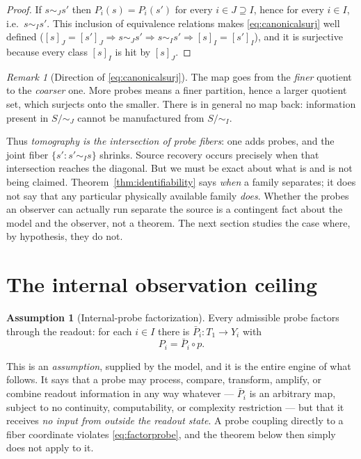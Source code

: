 \documentclass[11pt,reqno]{amsart}
\theoremstyle{plain}
\theoremstyle{definition}
\newtheorem{assumption}[theorem]{Assumption}
\theoremstyle{remark}
\newtheorem{remark}[theorem]{Remark}
\begin{document}
\begin{proof}
If $s\sim_J s'$ then $P_i(s)=P_i(s')$ for every $i\in J\supseteq I$, hence for every $i\in I$, i.e.\ $s\sim_I s'$. This inclusion of equivalence relations makes \eqref{eq:canonicalsurj} well defined ($[s]_J=[s']_J\Rightarrow s\sim_J s'\Rightarrow s\sim_I s'\Rightarrow [s]_I=[s']_I$), and it is surjective because every class $[s]_I$ is hit by $[s]_J$.
\end{proof}

\begin{remark}[Direction of \eqref{eq:canonicalsurj}]
The map goes from the \emph{finer} quotient to the \emph{coarser} one. More probes means a finer partition, hence a larger quotient set, which surjects onto the smaller. There is in general no map back: information present in $S/\!\sim_J$ cannot be manufactured from $S/\!\sim_I$.
\end{remark}

Thus \emph{tomography is the intersection of probe fibers}: one adds probes, and the joint fiber $\{s':s'\sim_I s\}$ shrinks. Source recovery occurs precisely when that intersection reaches the diagonal. But we must be exact about what is and is not being claimed. Theorem~\ref{thm:identifiability} says \emph{when} a family separates; it does not say that any particular physically available family \emph{does}. Whether the probes an observer can actually run separate the source is a contingent fact about the model and the observer, not a theorem. The next section studies the case where, by hypothesis, they do not.

\section{The internal observation ceiling}\label{sec:ceiling}

\begin{assumption}[Internal-probe factorization]\label{ass:factorization}
Every admissible probe factors through the readout: for each $i\in I$ there is $\bar P_i\colon T_1\to Y_i$ with
\begin{equation}\label{eq:factorprobe}
P_i=\bar P_i\circ p .
\end{equation}
\end{assumption}

This is an \emph{assumption}, supplied by the model, and it is the entire engine of what follows. It says that a probe may process, compare, transform, amplify, or combine readout information in any way whatever --- $\bar P_i$ is an arbitrary map, subject to no continuity, computability, or complexity restriction --- but that it receives \emph{no input from outside the readout state}. A probe coupling directly to a fiber coordinate violates \eqref{eq:factorprobe}, and the theorem below then simply does not apply to it.
\end{document}
